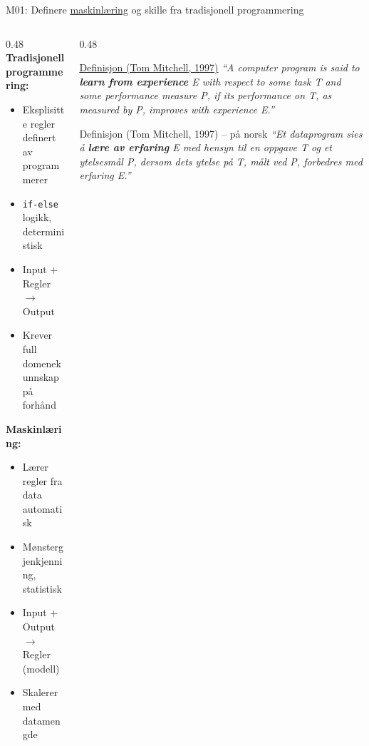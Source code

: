 \documentclass[aspectratio=169, 10pt]{beamer}
\begin{document}
\begin{frame}{M01: Definere \href{https://en.wikipedia.org/wiki/Machine_learning}{maskinlæring} og skille fra tradisjonell programmering}

    \begin{columns}
        \begin{column}{0.48\textwidth}
            \textbf{Tradisjonell programmering:}
            \begin{itemize}
                \item Eksplisitte regler definert av programmerer
                \item \texttt{if-else} logikk, deterministisk
                \item Input + Regler $\rightarrow$ Output
                \item Krever full domenekunnskap på forhånd
            \end{itemize}

            \vspace{2mm}
            \textbf{Maskinlæring:}
            \begin{itemize}
                \item Lærer regler fra data automatisk
                \item Mønstergjenkjenning, statistisk
                \item Input + Output $\rightarrow$ Regler (modell)
                \item Skalerer med datamengde
            \end{itemize}
        \end{column}

        \begin{column}{0.48\textwidth}
            \begin{block}{\scriptsize \href{https://www.cs.cmu.edu/~tom/mlbook.html}{Definisjon (Tom Mitchell, 1997)}}
                \scriptsize
                \textit{``A computer program is said to \textbf{\textit{learn from experience}} E with respect to some task T and some performance measure P, if its performance on T, as measured by P, improves with experience E.''}
            \end{block}

            \begin{block}{\scriptsize Definisjon (Tom Mitchell, 1997) -- på norsk}
                \scriptsize
                \textit{``Et dataprogram sies å \textbf{\textit{lære av erfaring}} E med hensyn til en oppgave T og et ytelsesmål P, dersom dets ytelse på T, målt ved P, forbedres med erfaring E.''}
            \end{block}
        \end{column}
    \end{columns}

\end{frame}
\end{document}

